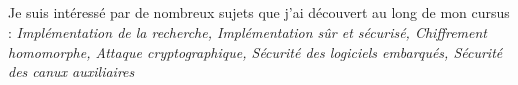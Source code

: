 \documentclass[letterpaper,10pt]{article}
\begin{document}



  \documentTitle{\fullName}
    {\hspace{2pt}\faPhone\ \href{tel:0750641522}{\phonenumber\\}}
    {\faEnvelope\ \href{mailto:florian.duzes@inria.fr}{\mail\\}}
    {\faLinkedin\ \href{https://www.linkedin.com/in/florian-duzes/}{\linkedin\\}}
    {\faGithub\ \href{https://github.com/FloDarPie}{\github}}


\medbreak
{} Je suis intéressé par de nombreux sujets que j'ai découvert au long de mon cursus : \textit{Implémentation de la recherche, Implémentation sûr et sécurisé, Chiffrement homomorphe, Attaque cryptographique, Sécurité des logiciels embarqués, Sécurité des canux auxiliaires}



  


  


  

\end{document}
